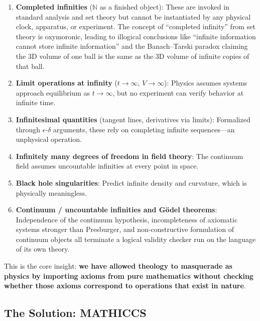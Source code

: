 \documentclass[11pt,a4paper]{article}
\begin{document}
\begin{enumerate}
  \item \textbf{Completed infinities} ($\mathbb{N}$ as a finished object):
    These are invoked in standard analysis and set theory but cannot be
    instantiated by any physical clock, apparatus, or experiment. The concept
    of ``completed infinity'' from set theory is oxymoronic, leading to
    illogical conclusions like ``infinite information cannot store infinite
    information'' and the Banach--Tarski paradox claiming the 3D volume of
    one ball is the same as the 3D volume of infinite copies of that ball.

  \item \textbf{Limit operations at infinity} ($t \to \infty$, $V \to \infty$):
    Physics assumes systems approach equilibrium as $t \to \infty$, but no
    experiment can verify behavior at infinite time.

  \item \textbf{Infinitesimal quantities} (tangent lines, derivatives via limits):
    Formalized through $\epsilon$-$\delta$ arguments, these rely on completing
    infinite sequences---an unphysical operation.

  \item \textbf{Infinitely many degrees of freedom in field theory}:
    The continuum field assumes uncountable infinities at every point in space.

  \item \textbf{Black hole singularities}:
    Predict infinite density and curvature, which is physically meaningless.

  \item \textbf{Continuum / uncountable infinities and G\"odel theorems}:
    Independence of the continuum hypothesis, incompleteness of axiomatic
    systems stronger than Presburger, and non-constructive formulation of
    continuum objects all terminate a logical validity checker run on the
    language of its own theory.
\end{enumerate}

This is the core insight: \textbf{we have allowed theology to masquerade as
physics by importing axioms from pure mathematics without checking whether
those axioms correspond to operations that exist in nature}.

\subsection{The Solution: MATHICCS}
\end{document}
